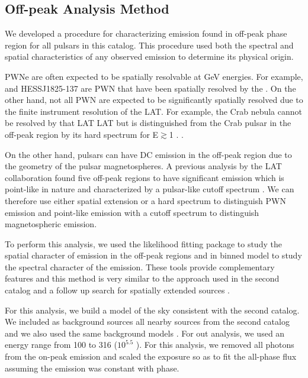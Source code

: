 \subsection{Off-peak Analysis Method}
\label{subsec:off_peak_analysis}

We developed a procedure for characterizing emission found
in off-peak phase region for all pulsars in this catalog.  
This procedure used both the spectral and spatial characteristics
of any observed emission to determine its physical origin.

PWNe are often expected to be spatially
resolvable at GeV energies. For example, \velax and HESS\;J1825-137 are PWN
that have been spatially resolved by the \lat 
\citep{LAT_collaboration_Vela_X_2010,LAT_collaboration_HESS_J1825_2011}.
On the other hand, not all PWN are expected to be
significantly spatially resolved due to the finite
instrument resolution of the LAT. For example, the Crab nebula 
cannot be resolved by that LAT LAT but is distinguished from the Crab
pulsar in the off-peak region by its hard spectrum for E$\gtrsim$1 \gev.
\citep{LAT_collaboration_crab_2010}.

On the other hand, pulsars can have DC emission in the off-peak region
due to the geometry of the pulsar magnetospheres.  A previous analysis
by the LAT collaboration found five off-peak regions to have significant
emission which is point-like in nature and characterized by a
pulsar-like cutoff spectrum \citep{LAT_collaboration_PWNCAT_2011}.
We can therefore use either spatial extension or a hard spectrum to
distinguish PWN emission and point-like emission with a cutoff spectrum
to distinguish magnetospheric emission.

To perform this analysis, we used the likelihood fitting package \pointlike
to study the spatial character of emission in the off-peak regions
and \gtlike in binned model to study the spectral character of
the emission. These tools provide complementary features and this
method is very similar to the approach used in the second \lat catalog
\citep{LAT_Collaboration_2FGL_2012} and a follow up search for spatially
extended sources \citep{LAT_collaboration_extended_search_2012}.

For this analysis, we build a model of the sky consistent with the
second \lat catalog. We included as background sources all nearby
sources from the second catalog and we also used the same background models 
\citep{LAT_Collaboration_2FGL_2012}.  For out analysis, we used
an energy range from 100 \mev to 316 \gev ($10^{5.5}$ \mev).  For this analysis, 
we removed all photons from the on-peak emission and scaled the exposure so as to fit
the all-phase flux assuming the emission was constant with phase.

